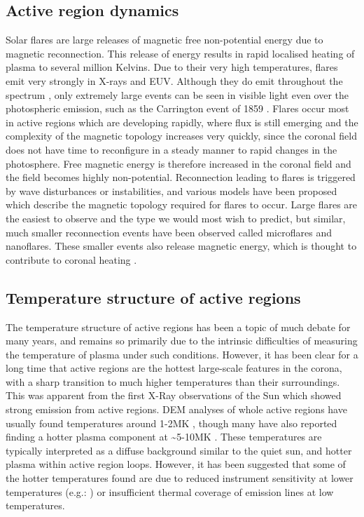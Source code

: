 \documentclass{article}
\begin{document}
\subsection{Active region dynamics}
Solar flares are large releases of magnetic free non-potential energy
due to magnetic reconnection. This release of energy results in rapid
localised heating of plasma to several million Kelvins. Due to their
very high temperatures, flares emit very strongly in X-rays and EUV.
Although they do emit throughout the spectrum \citep{Fletcher2011},
only extremely large events can be seen in visible light even over
the photospheric emission, such as the Carrington event of 1859 \citep{Carrington1859}.
Flares occur most in active regions which are developing rapidly,
where flux is still emerging and the complexity of the magnetic topology
increases very quickly, since the coronal field does not have time
to reconfigure in a steady manner to rapid changes in the photosphere.
Free magnetic energy is therefore increased in the coronal field and
the field becomes highly non-potential. Reconnection leading to flares
is triggered by wave disturbances or instabilities, and various models
have been proposed which describe the magnetic topology required for
flares to occur. Large flares are the easiest to observe and the type
we would most wish to predict, but similar, much smaller reconnection
events have been observed called microflares and nanoflares. These
smaller events also release magnetic energy, which is thought to contribute
to coronal heating .

\subsection{Temperature structure of active regions}
The temperature structure of active regions has been a topic of much debate for many years, and remains so primarily due to the intrinsic difficulties of measuring the temperature of plasma under such conditions.
However, it has been clear for a long time that active regions are the hottest large-scale features in the corona, with a sharp transition to much higher temperatures than their surroundings.
This was apparent from the first X-Ray observations of the Sun which showed strong emission from active regions.
DEM analyses of whole active regions have usually found temperatures around 1-2MK \citep{Brosius1996,Kashyap1998,Schmelz2009,Reale2009,Warren2009a,Goryaev2010}, though many have also reported finding a hotter plasma component at \textasciitilde{}5-10MK \citep{Brosius1996,Kashyap1998,Schmelz2009,Reale2009}.
These temperatures are typically interpreted as a diffuse background similar to the quiet sun, and hotter plasma within active region loops.
However, it has been suggested that some of the hotter temperatures found are due to reduced instrument sensitivity at lower temperatures (e.g.: \citet{Boerner2013}) or insufficient thermal coverage of emission lines at low temperatures.
\end{document}
